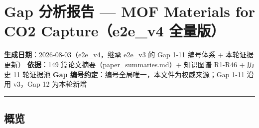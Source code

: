 \documentclass[12pt,a4paper]{ctexart}
\begin{document}
\section{Gap 分析报告 --- MOF Materials for CO2 Capture（e2e\_v4 全量版）}\label{gap:gap-ux5206ux6790ux62a5ux544a-mof-materials-for-co2-capturee2e_v4-ux5168ux91cfux7248}

\textbf{生成日期}：2026-08-03（e2e\_v4，继承 e2e\_v3 的 Gap 1-11 编号体系 + 本轮证据更新） \textbf{依据}：149 篇论文摘要（paper\_summaries.md）+ 知识图谱 R1-R46 + 历史 11 轮证据池 \textbf{Gap 编号约定}：编号全局唯一，本文件为权威来源；Gap 1-11 沿用 v3，Gap 12 为本轮新增

\begin{center}\rule{0.5\linewidth}{0.5pt}\end{center}

\subsection{概览}\label{gap:ux6982ux89c8}
\end{document}
